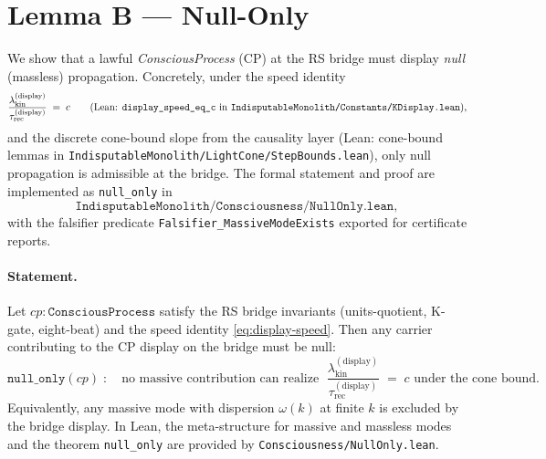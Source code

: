 \documentclass[12pt,a4paper]{article}
\begin{document}
\section{Lemma B — Null-Only}
\label{sec:lemmaB}

We show that a lawful \emph{ConsciousProcess} (CP) at the RS bridge must display \emph{null} (massless) propagation. Concretely, under the speed identity
\begin{equation}
  \frac{\lambda_{\mathrm{kin}}^{\mathrm{(display)}}}{\tau_{\mathrm{rec}}^{\mathrm{(display)}}} \;=\; c
  \qquad\text{(Lean: \texttt{display\_speed\_eq\_c} in \texttt{IndisputableMonolith/Constants/KDisplay.lean}),}
  \label{eq:display-speed}
\end{equation}
and the discrete cone-bound slope from the causality layer (Lean: cone-bound lemmas in \texttt{IndisputableMonolith/LightCone/StepBounds.lean}), only null propagation is admissible at the bridge. The formal statement and proof are implemented as \texttt{null\_only} in
\[
  \texttt{IndisputableMonolith/Consciousness/NullOnly.lean},
\]
with the falsifier predicate \texttt{Falsifier\_MassiveModeExists} exported for certificate reports.

\paragraph{Statement.}
Let \(cp:\texttt{ConsciousProcess}\) satisfy the RS bridge invariants (units-quotient, K-gate, eight-beat) and the speed identity \eqref{eq:display-speed}. Then any carrier contributing to the CP display on the bridge must be null:
\[
  \texttt{null\_only}(cp)\;:\quad
  \text{no massive contribution can realize }\;
  \frac{\lambda_{\mathrm{kin}}^{\mathrm{(display)}}}{\tau_{\mathrm{rec}}^{\mathrm{(display)}}} \;=\; c
  \text{ under the cone bound.}
\]
Equivalently, any massive mode with dispersion \(\omega(k)\) at finite \(k\) is excluded by the bridge display. In Lean, the meta-structure for massive and massless modes and the theorem \texttt{null\_only} are provided by \texttt{Consciousness/NullOnly.lean}.
\end{document}

